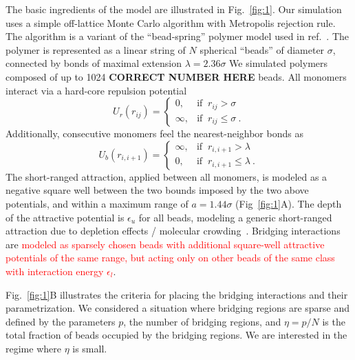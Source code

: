 \documentclass[
preprint,
a4paper,
12pt,
superscriptaddress,
pre]{revtex4}
\newcommand{\rev}[1]{\textcolor{red}{#1}}
\begin{document}
The basic ingredients of the model are illustrated in
Fig.~\ref{fig:1}. Our simulation uses a simple off-lattice Monte Carlo
algorithm with Metropolis rejection rule. The algorithm is a variant
of the ``bead-spring'' polymer model used in
ref.~\cite{Cacciuto2006}. The polymer is represented as a linear
string of $N$ spherical ``beads'' of diameter $\sigma$, connected by
bonds of maximal extension $\lambda = 2.36 \sigma$
We simulated polymers composed of up to 1024 \textbf{CORRECT NUMBER
  HERE} beads.  All monomers interact via a hard-core repulsion
potential
\begin{displaymath}
  U_r(r_{ij}) = \begin{cases} 
    0,  & \mbox{if }\ r_{ij} > \sigma \\ 
    \infty, & \mbox{if }\ r_{ij} \leq \sigma \ . 
  \end{cases} 
\end{displaymath}
Additionally, consecutive monomers feel the nearest-neighbor bonds as 
\begin{displaymath}
  U_b(r_{i,i+1}) = \begin{cases} 
    \infty,  & \mbox{if }\ r_{i,i+1} > \lambda \\ 
    0, & \mbox{if }\ r_{i,i+1} \leq \lambda \ . 
  \end{cases} 
\end{displaymath}
The short-ranged attraction, applied between all monomers, is modeled as a
negative square well between the two bounds imposed by the two above
potentials, and within a maximum range of $a = 1.44 \sigma$
(Fig~\ref{fig:1}A). The depth of the attractive potential is
$\epsilon_u$ for all beads, modeling a generic short-ranged attraction
due to depletion effects / molecular crowding~\cite{Noro2000}.
Bridging interactions are \rev{modeled as sparsely chosen beads with additional square-well attractive potentials of the same range, but acting only on other beads of the same class with interaction energy $\epsilon_l$}.
%

Fig.~\ref{fig:1}B illustrates the criteria for placing the bridging
interactions and their parametrization. We considered a situation
where bridging regions are sparse and defined by the parameters $p$,
the number of bridging regions, and $\eta=p/N$ is the total fraction
of beads occupied by the bridging regions. We are interested in the
regime where $\eta$ is small. 
\end{document}
